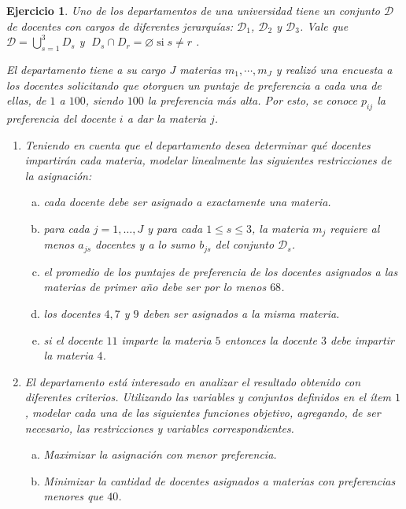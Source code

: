 \documentclass[a4paper,oneside,12pt]{amsart}
\newcommand{\mc}[1]{\mathcal{#1}}
\newtheorem{quest}{Ejercicio}
\begin{document}
\begin{quest} 
Uno de los departamentos de una universidad tiene un conjunto $\mc{D}$ de docentes con cargos de diferentes jerarquías: $\mc{D}_1$, $\mc{D}_2$ y $\mc{D}_3$. Vale que $\mc{D} = \bigcup_{s=1}^3 D_s$ y $\; D_s\cap D_r =\varnothing\;\text{si}\; s\neq r$ . 

El departamento tiene a su cargo $J$ materias $m_1,\cdots, m_J$ y realizó una encuesta a los docentes solicitando que otorguen un puntaje de preferencia a cada una de ellas, de $1$ a $100$, siendo $100$ la preferencia más alta. Por esto, se conoce $p_{ij}$ la preferencia del docente $i$ a dar la materia $j$.

\begin{enumerate}
    \item Teniendo en cuenta que el departamento desea determinar qué docentes impartirán cada materia, modelar linealmente las siguientes restricciones de la asignación:
    \begin{enumerate}[a)]
        \item cada docente debe ser asignado a exactamente una materia.
        \item para cada $j=1,\dots, J$ y para cada $1\leq s\leq 3$, la materia $m_j$  requiere al menos $a_{js}$ docentes y a lo sumo $b_{js}$ del conjunto $\mc{D}_s$.
        \item el promedio de los puntajes de preferencia de los docentes asignados a las materias de primer año debe ser por lo menos $68$.
        \item los docentes $4, 7$ y $9$ deben ser asignados a la misma materia.
        \item si el docente $11$ imparte la materia $5$ entonces la docente $3$ debe impartir la materia $4$.
    \end{enumerate}
    \item El departamento está interesado en analizar el resultado obtenido con diferentes criterios. Utilizando las variables y conjuntos definidos en el ítem $1$, modelar cada una de las siguientes funciones objetivo, agregando, de ser necesario, las restricciones y variables correspondientes.
    \begin{enumerate}[a)]
        \item Maximizar la asignación con menor preferencia.
        \item Minimizar la cantidad de docentes asignados a materias con preferencias menores que $40$.
    \end{enumerate}
\end{enumerate}

\end{quest}
\end{document}
